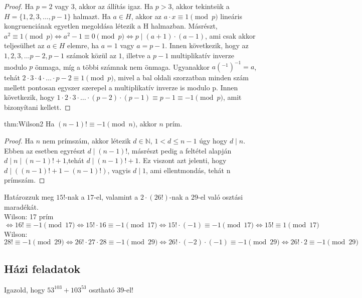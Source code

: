 \begin{proof}
	Ha $p=2$ vagy $3$, akkor az állítás igaz. Ha $p>3$, akkor tekintsük
	a $H=\{1,2,3,\ldots,p-1\}$ halmazt. Ha $a\in H$, akkor az $a\cdot x\equiv1\pmod p$
	lineáris kongruenciának egyetlen megoldása létezik a H halmazban.
	Másrészt, $a^{2}\equiv1\pmod p\Leftrightarrow a^{2}-1\equiv0\pmod p\Leftrightarrow p\mid(a+1)\cdot(a-1)$,
	ami csak akkor teljesülhet az $a\in H$ elemre, ha $a=1$ vagy $a=p-1$.
	Innen következik, hogy az $1,2,3,\ldots p-2,p-1$ számok közül az
	$1$, illetve a $p-1$ multiplikatív inverze modulo $p$ önmaga, míg
	a többi számnak nem önmaga. Ugyanakkor $a(^{-1})^{-1}=a$, tehát $2\cdot3\cdot4\cdot\ldots\cdot p-2\equiv1\pmod p$,
	mivel a bal oldali szorzatban minden szám mellett pontosan egyszer
	szerepel a multiplikatív inverze is modulo p. Innen következik, hogy
	$1\cdot2\cdot3\cdot\ldots\cdot(p-2)\cdot(p-1)\equiv p-1\equiv-1\pmod p$,
	amit bizonyítani kellett. 
\end{proof}
\begin{theorem}{thm:Wilson2}
	Ha $(n-1)!\equiv-1\pmod n$, akkor $n$
	prím. 
\end{theorem}

\begin{proof}
	Ha $n$ nem prímszám, akkor létezik $d\in\mathbb{N}$, $1<d\leq n-1$
	úgy hogy $d\mid n$. Ebben az esetben egyrészt $d\mid(n-1)!$, másrészt
	pedig a feltétel alapján $d\mid n\mid(n-1)!+1$,tehát $d\mid(n-1)!+1$.
	Ez viszont azt jelenti, hogy $d\mid((n-1)!+1-(n-1)!)$, vagyis $d\mid1$,
	ami ellentmondás, tehát n prímszám. 
\end{proof}

\begin{example}
	Határozzuk meg $15!$-nak a $17$-el, valamint a $2\cdot(26!)$-nak
	a $29$-el való osztási maradékát.\\
	Wilson: 17 prím $\Leftrightarrow16!\equiv-1\pmod{17}\Leftrightarrow15!\cdot16\equiv-1\pmod{17}\Leftrightarrow15!\cdot(-1)\equiv-1\pmod{17}\Leftrightarrow15!\equiv1\pmod{17}$\\
	Wilson: $28!\equiv-1\pmod{29}\Leftrightarrow26!\cdot27\cdot28\equiv-1\pmod{29}\Leftrightarrow26!\cdot(-2)\cdot(-1)\equiv-1\pmod{29}\Leftrightarrow26!\cdot2\equiv-1\pmod{29}$
\end{example}

\subsection*{Házi feladatok}
\begin{problem}
	Igazold, hogy $53^{103}+103^{53}$ osztható 39-el! 
\end{problem}


